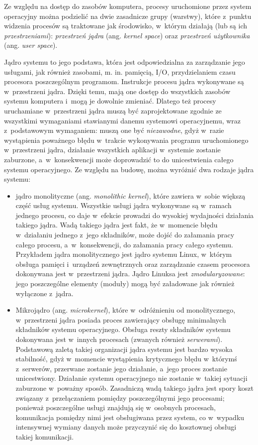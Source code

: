 \documentclass[11pt,makeidx]{mwart}
\begin{document}
%
\indent
	Ze względu na dostęp do zasobów komputera, procesy uruchomione przez system operacyjny można podzielić 
	na dwie zasadnicze grupy (warstwy), które z~punktu widzenia procesów są traktowane jak środowisko, w~którym działają 
	(lub są ich \emph{przestrzeniami}): 
	\emph{przestrzeń jądra} (ang. \emph{kernel space}) oraz \emph{przestrzeń użytkownika} (ang. \emph{user space}).
\par
%
\indent
	Jądro systemu to jego podstawa, która jest odpowiedzialna za zarządzanie jego usługami, jak również zasobami, m. in. pamięcią, I/O,
	przydzielaniem czasu procesora poszczególnym programom. Instrukcje procesu jądra wykonywane są w~przestrzeni jądra. Dzięki temu,
	mają one dostęp do wszystkich zasobów systemu komputera i~mogą je dowolnie zmieniać. Dlatego też procesy uruchamiane w~przestrzeni
	jądra muszą być zaprojektowane zgodnie ze wszystkimi wymaganiami stawianymi danemu systemowi operacyjnemu, wraz z~podstawowym wymaganiem:
	muszą one być \emph{niezawodne}, gdyż w~razie wystąpienia poważnego błędu w~trakcie wykonywania programu uruchomionego w~przestrzeni jądra,
	działanie wszystkich aplikacji w~systemie zostanie zaburzone, a~w~konsekwencji może doprowadzić to do unicestwienia całego systemu operacyjnego.
	Ze względu na budowę, można wyróżnić dwa rodzaje jądra systemu:
	\begin{itemize}
		\item jądro monolityczne (ang. \emph{monolithic kernel}), które zawiera w~sobie większą część usług systemu. Wszystkie usługi jądra
			wykonywane są w~ramach jednego procesu, co daje w~efekcie prowadzi do wysokiej wydajności działania takiego jądra. Wadą takiego jądra
			jest fakt, że w~momencie błędu w~działaniu jednego z~jego składników, może dojść do załamania pracy całego procesu, a~w~konsekwencji,
			do załamania pracy całego systemu.
			Przykładem jądra monolitycznego jest jądro systemu Linux, w~którym obsługa pamięci i~urządzeń zewnętrznych oraz zarządzanie czasem procesora
			dokonywana jest w~przestrzeni jądra. Jądro Linuksa jest \emph{zmodularyzowane}: jego poszczególne elementy (moduły) mogą być załadowane
			jak również wyłączone z~jądra.
		\item Mikrojądro (ang. \emph{microkernel}), które w~odróżnieniu od monolitycznego, w~przestrzeni jądra posiada proces zawierający
			obsługę minimalnych składników systemu operacyjnego. Obsługa reszty składników systemu dokonywana jest w~innych procesach
			(zwanych również \emph{serwerami}). Podstawową zaletą takiej organizacji jądra systemu jest bardzo wysoka stabilność, gdyż w~momencie
			wystąpienia krytycznego błędu w~którymś z~serwerów, przerwane zostanie jego działanie, a~jego proces zostanie unicestwiony.
			Działanie systemu operacyjnego nie zostanie w~takiej sytuacji
			zaburzone w~poważny sposób. Zasadniczą wadą takiego jądra jest spory koszt związany z~przełączaniem pomiędzy poszczególnymi jego procesami;
			ponieważ poszczególne usługi znajdują się w~osobnych procesach, komunikacja pomiędzy nimi jest obsługiwana przez system, co
			w~wypadku intensywnej wymiany danych może przyczynić się do kosztownej obsługi takiej komunikacji.
	\end{itemize}
\end{document}
